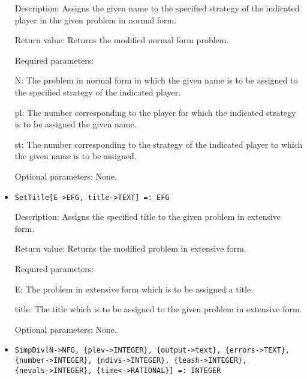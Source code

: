 \begin{itemize}
\bd
\item
[Description:] Assigns the given name to the specified strategy of the
indicated player in the given problem in normal form.
\item
[Return value:] Returns the modified normal form problem.
\item
[Required parameters:]\hfil\null
	
\bd
\item
[N:] The problem in normal form in which the given name is to be
assigned to the specified strategy of the indicated player.
\item
[pl:] The number corresponding to the player for which the indicated
strategy is to be assigned the given name.
\item
[st:] The number corresponding to the strategy of the indicated player
to which the given name is to be assigned.
\ed

\item
[Optional parameters:] None.

\ed

\item

\protect \large \begin{verbatim}
SetTitle[E->EFG, title->TEXT] =: EFG
\end{verbatim}\normalsize

\bd
\item
[Description:] Assigns the specified title to the given problem in
extensive form.
\item
[Return value:] Returns the modified problem in extensive form.
\item
[Required parameters:]\hfil\null
	
\bd
\item
[E:] The problem in extensive form which is to be assigned a title.
\item
[title:] The title which is to be assigned to the given problem in
extensive form.
\ed

\item
[Optional parameters:] None.
\ed

\item
\protect \large \begin{verbatim}
SimpDiv[N->NFG, {plev->INTEGER}, {output->text}, {errors->TEXT},
{number->INTEGER}, {ndivs->INTEGER}, {leash->INTEGER},
{nevals->INTEGER}, {time<->RATIONAL}] =: INTEGER
\end{verbatim}\normalsize


\end{itemize}
